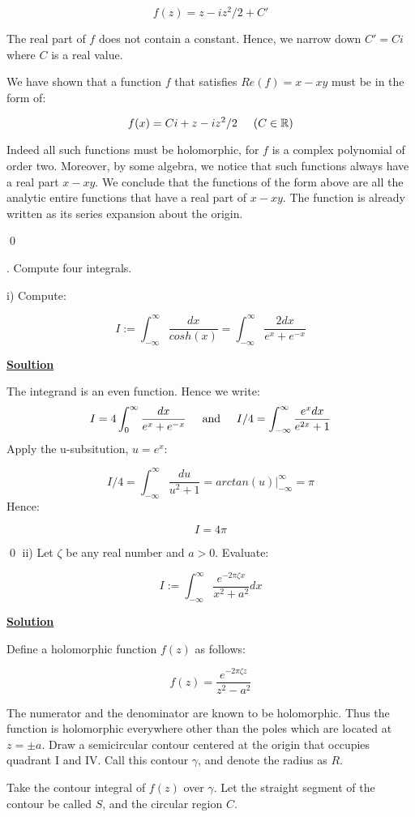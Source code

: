 \documentclass{article}
\newcommand{\new}[1]{
    \vspace{2mm}
    \noindent
    \textbf{
    \underline{#1}}
}
\newcounter{problemcnt}
\newcommand{\Problem}{{
    \vspace{5mm}
    \stepcounter{problemcnt}
    \noindent
    \arabic{problemcnt}. 
}
}
\newcommand{\textAnd}{
    {
        \hspace{5mm}
        \textrm{and}
        \hspace{5mm}
    }
}
\begin{document}
\[
    f(z) = z-iz^2/2+C'
\]

The real part of $f$ does not contain a constant. Hence, we narrow 
down $C' = Ci$ where $C$ is a real value. 

We have shown that a function 
$f$ that satisfies $Re(f) = x-xy$ must be in the form of:

\[
    f(x) = Ci + z-iz^2/2\hspace{5mm} (C \in \mathbb{R})
\]

Indeed all such functions must be holomorphic, for $f$ is 
a complex polynomial of order two. Moreover, by some algebra, 
we notice that such functions always have a real part $x-xy$. 
We conclude that the functions of the form above are all the 
analytic entire 
functions that have a real part of $x - xy$. The function 
is already written as its series expansion about the origin. 

\qed

\newpage
\Problem Compute four integrals. 


i) Compute:

\[
    I := \int_{-\infty}^\infty 
    \frac{dx}{cosh(x)}
     = \int_{-\infty}^{\infty}
    \frac{2dx}{e^x+e^{-x}}
\]

\new{Soultion}
The integrand is an even function. Hence we write:
\[
    I = 4\int_0^\infty \frac{dx}{e^x+e^{-x}}
    \textAnd 
    I/4 = \int_{-\infty}^\infty \frac{e^xdx}{e^{2x}+1}
\]
Apply the u-subsitution, $u = e^x$:

\[
    I/4 = \int^\infty_{-\infty}
    \frac{du}{u^2+1}
    =arctan(u)\bigg|^\infty_{-\infty}
    =\pi
\]
Hence:

\[
    I = 4\pi
\]

\qed
\newpage
ii) Let $\zeta$ be any real number and $a > 0$. Evaluate:

\[
    I:=
    \int_{-\infty}^\infty 
    \frac{e^{-2\pi \zeta x}}
    {x^2 + a^2}
    dx
\]

\new{Solution}
Define a holomorphic function $f(z)$ as follows:

\[
    f(z) = \frac{e^{-2\pi \zeta z}}{z^2 - a^2}
\]

The numerator and the denominator are known to be holomorphic. Thus 
the function is holomorphic everywhere other than the poles which are 
located at $z = \pm a$. Draw a semicircular contour centered 
at the origin that occupies quadrant I and IV. Call this 
contour $\gamma$, and denote the radius as $R$. 

Take the contour integral of $f(z)$ over $\gamma$. Let the 
straight segment of the contour be called $S$, and the circular 
region $C$. 
\end{document}
